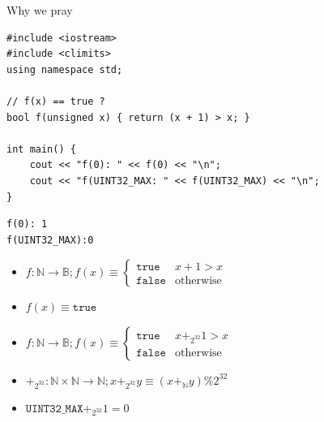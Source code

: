 \documentclass[8pt]{beamer}
\newcommand{\N}{\mathbb N}
\newcommand{\B}{\mathbb B}
\begin{document}
\begin{frame}[fragile]{Why we pray}
\pause

{\small
\begin{verbatim}
#include <iostream>
#include <climits>
using namespace std;

// f(x) == true ?
bool f(unsigned x) { return (x + 1) > x; }

int main() {
    cout << "f(0): " << f(0) << "\n";
    cout << "f(UINT32_MAX: " << f(UINT32_MAX) << "\n";
}
\end{verbatim}
}

\pause
\begin{verbatim}
f(0): 1
f(UINT32_MAX):0
\end{verbatim}

\pause
\begin{itemize}
    \item 
        $f: \N \rightarrow \B; f(x) \equiv \begin{cases} \texttt{true} & x + 1 > x \\ \texttt{false} & \text{otherwise} \end{cases}$
        \pause
    \item $f(x) \equiv \texttt{true}$ \pause
    \item $f: \N \rightarrow \B; f(x) \equiv \begin{cases} \texttt{true} & x +_{2^{32}} 1 > x \\ \texttt{false} & \text{otherwise} \end{cases}$ \pause
    \item $+_{2^32}: \N \times \N \rightarrow \N; x +_{2^{32}} y \equiv (x +_\N y) \% 2^{32}$ \pause 
    \item $\texttt{UINT32\_MAX} +_{2^{32}} 1 = 0 $
\end{itemize}
\end{frame}
\end{document}
